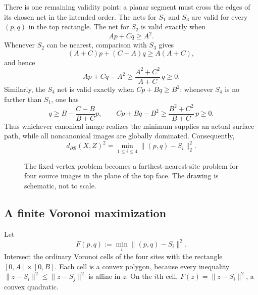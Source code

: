 \documentclass[11pt]{article}
\theoremstyle{definition}
\newcommand{\Surf}{\partial\mathcal B}
\newcommand{\distS}{d_{\Surf}}
\begin{document}
There is one remaining validity point: a planar segment must cross the edges
of its chosen net in the intended order.  The nets for $S_1$ and $S_3$ are
valid for every $(p,q)$ in the top rectangle.  The net for $S_2$ is valid
exactly when
\[
  Ap+Cq\ge A^2.
\]
Whenever $S_2$ can be nearest, comparison with $S_3$ gives
\[
  (A+C)p+(C-A)q\ge A(A+C),
\]
and hence
\[
 Ap+Cq-A^2\ge \frac{A^2+C^2}{A+C}\,q\ge0.
\]
Similarly, the $S_4$ net is valid exactly when $Cp+Bq\ge B^2$; whenever $S_4$
is no farther than $S_1$, one has
\[
 q\ge B-\frac{C-B}{B+C}p,
 \qquad
 Cp+Bq-B^2\ge\frac{B^2+C^2}{B+C}\,p\ge0.
\]
Thus whichever canonical image realizes the minimum supplies an actual
surface path, while all noncanonical images are globally dominated.
Consequently,
\begin{equation}\label{eq:top-min}
  \distS(X,Z)^2=\min_{1\le i\le4}\lVert(p,q)-S_i\rVert_2^2.
\end{equation}

\begin{figure}[ht]
\centering
{}
\caption{The fixed-vertex problem becomes a farthest-nearest-site problem for
four source images in the plane of the top face.  The drawing is schematic,
not to scale.}
\label{fig:sources}
\end{figure}

\subsection{A finite Voronoi maximization}

Let
\[
  F(p,q):=\min_i\lVert(p,q)-S_i\rVert^2.
\]
Intersect the ordinary Voronoi cells of the four sites with the rectangle
$[0,A]\times[0,B]$.  Each cell is a convex polygon, because every inequality
$\lVert z-S_i\rVert^2\le\lVert z-S_j\rVert^2$ is affine in $z$.  On the
$i$th cell, $F(z)=\lVert z-S_i\rVert^2$, a convex quadratic.
\end{document}
